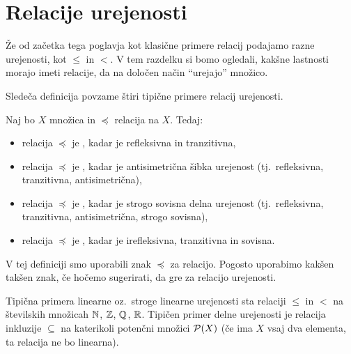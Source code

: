         \section{Relacije urejenosti}\label{razdelek:relacije-urejenosti}

                Že od začetka tega poglavja kot klasične primere relacij podajamo razne urejenosti, kot $\leq$ in $<$. V tem razdelku si bomo ogledali, kakšne lastnosti morajo imeti relacije, da na določen način ``urejajo'' množico.

                Sledeča definicija povzame štiri tipične primere relacij urejenosti.

                \begin{definicija}
                        Naj bo $X$ množica in $\preceq$ relacija na $X$. Tedaj:
                        \begin{itemize}
                                \item
                                        relacija $\preceq$ je , kadar je refleksivna in tranzitivna,
                                \item
                                        relacija $\preceq$ je , kadar je antisimetrična šibka urejenost (tj.~refleksivna, tranzitivna, antisimetrična),
                                \item
                                        relacija $\preceq$ je , kadar je strogo sovisna delna urejenost (tj.~refleksivna, tranzitivna, antisimetrična, strogo sovisna),
                                \item
                                        relacija $\preceq$ je , kadar je irefleksivna, tranzitivna in sovisna.
                        \end{itemize}
                \end{definicija}

                V tej definiciji smo uporabili znak $\preceq$ za relacijo. Pogosto uporabimo kakšen takšen znak, če hočemo sugerirati, da gre za relacijo urejenosti.

                Tipična primera linearne oz.~stroge linearne urejenosti sta relaciji $\leq$ in $<$ na številskih množicah $\mathbb{N}$, $\mathbb{Z}$, $\mathbb{Q}$, $\mathbb{R}$. Tipičen primer delne urejenosti je relacija inkluzije $\subseteq$ na katerikoli potenčni množici $\mathcal{P}(X)$ (če ima $X$ vsaj dva elementa, ta relacija ne bo linearna).

